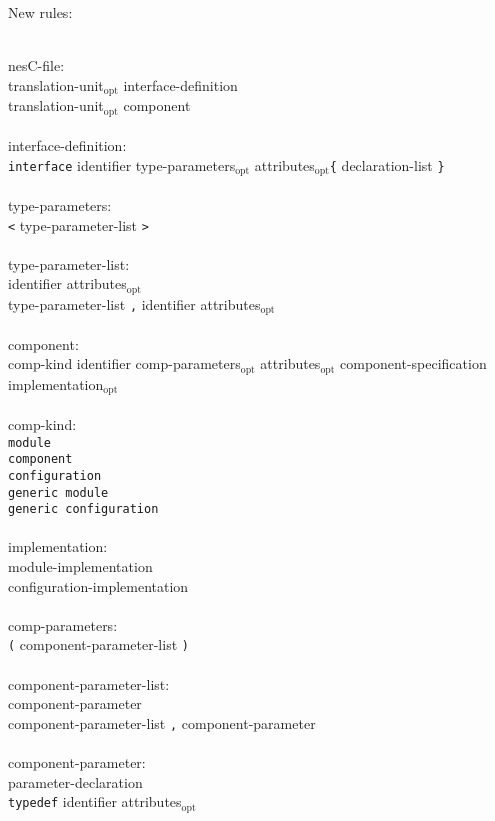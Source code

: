 \documentclass[11pt,letterpaper]{article}
\newcommand{\kw}[1]{{\tt #1}}
\newcommand{\opt}{$_{\mbox{opt}}$\xspace}
\newcommand{\grammarindent}{\hspace*{2cm}\= \\ \kill}
\begin{document}
New rules: \em \begin{tabbing}
\grammarindent
nesC-file: \\
\>	translation-unit\opt interface-definition\\
\>	translation-unit\opt component\\
\\
interface-definition:\\
\>	\kw{interface} identifier type-parameters\opt attributes\opt \kw{\{} declaration-list \kw{\}}\\
\\
type-parameters:\\
\>	\kw{<} type-parameter-list \kw{>}\\
\\
type-parameter-list:\\
\>	identifier attributes\opt\\
\>	type-parameter-list \kw{,} identifier attributes\opt\\
\\
component:\\
\>	comp-kind identifier comp-parameters\opt attributes\opt component-specification implementation\opt\\
\\
comp-kind:\\
\>	\kw{module}\\
\>	\kw{component}\\
\>	\kw{configuration}\\
\>	\kw{generic module}\\
\>	\kw{generic configuration}\\
\\
implementation:\\
\>	module-implementation\\
\>	configuration-implementation\\
\\
comp-parameters:\\
\>	\kw{(} component-parameter-list \kw{)}\\
\\
component-parameter-list:\\
\>	component-parameter\\
\>	component-parameter-list \kw{,} component-parameter\\
\\
component-parameter:\\
\>	parameter-declaration\\
\>	\kw{typedef} identifier attributes\opt\\

\end{tabbing}
\end{document}
